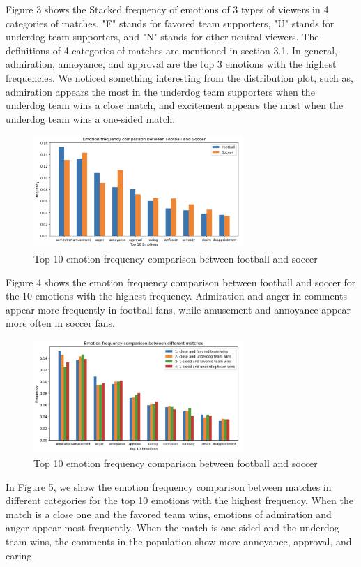\documentclass{article}
\begin{document}
Figure 3 shows the Stacked frequency of emotions of 3 types of viewers in 4 categories of matches. "F" stands for favored team supporters, "U" stands for underdog team supporters, and "N" stands for other neutral viewers. The definitions of 4 categories of matches are mentioned in section 3.1. In general, admiration, annoyance, and approval are the top 3 emotions with the highest frequencies. We noticed something interesting from the distribution plot, such as, admiration appears the most in the underdog team supporters when the underdog team wins a close match, and excitement appears the most when the underdog team wins a one-sided match.

\begin{figure}[h]
    \includegraphics[width=8cm]{SportsComparision.png}
    \caption{Top 10 emotion frequency comparison between football and soccer}
\end{figure}

Figure 4 shows the emotion frequency comparison between football and soccer for the 10 emotions with the highest frequency. Admiration and anger in comments appear more frequently in football fans, while amusement and annoyance appear more often in soccer fans.

\begin{figure}[h]
    \includegraphics[width=8cm]{MatchesComparision.png}
    \caption{Top 10 emotion frequency comparison between football and soccer}
\end{figure}

In Figure 5, we show the emotion frequency comparison between matches in different categories for the top 10 emotions with the highest frequency. When the match is a close one and the favored team wins, emotions of admiration and anger appear most frequently. When the match is one-sided and the underdog team wins, the comments in the population show more annoyance, approval, and caring.
\end{document}
